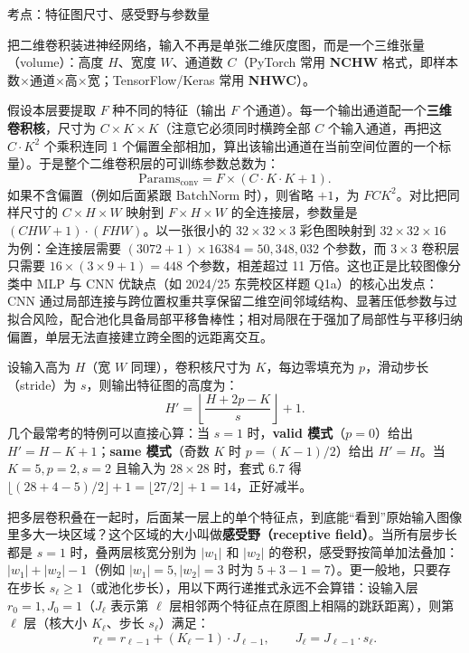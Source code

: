 考点：特征图尺寸、感受野与参数量 

把二维卷积装进神经网络，输入不再是单张二维灰度图，而是一个三维张量（volume）：高度 $H$、宽度 $W$、通道数 $C$（PyTorch 常用 \textbf{NCHW} 格式，即样本数\ensuremath{\times}通道\ensuremath{\times}高\ensuremath{\times}宽；TensorFlow/Keras 常用 \textbf{NHWC}）。

假设本层要提取 $F$ 种不同的特征（输出 $F$ 个通道）。每一个输出通道配一个\textbf{三维卷积核}，尺寸为 $C \times K \times K$（注意它必须同时横跨全部 $C$ 个输入通道，再把这 $C\cdot K^2$ 个乘积连同 1 个偏置全部相加，算出该输出通道在当前空间位置的一个标量）。于是整个二维卷积层的可训练参数总数为：
\[
\text{Params}_{\text{conv}} = F \times (C \cdot K \cdot K + 1).
\tag{6.6}
\]
如果不含偏置（例如后面紧跟 BatchNorm 时），则省略 $+1$，为 $F C K^2$。对比把同样尺寸的 $C\times H\times W$ 映射到 $F\times H\times W$ 的全连接层，参数量是 $(C H W + 1)\cdot(F H W)$。以一张很小的 $32\times 32\times 3$ 彩色图映射到 $32\times 32\times 16$ 为例：全连接层需要 $(3072+1)\times 16384 = 50{,}348{,}032$ 个参数，而 $3\times 3$ 卷积层只需要 $16\times(3\times 9+1) = 448$ 个参数，相差超过 11 万倍。这也正是比较图像分类中 MLP 与 CNN 优缺点（如 2024/25 东莞校区样题 Q1a）的核心出发点：CNN 通过局部连接与跨位置权重共享保留二维空间邻域结构、显著压低参数与过拟合风险，配合池化具备局部平移鲁棒性；相对局限在于强加了局部性与平移归纳偏置，单层无法直接建立跨全图的远距离交互。


设输入高为 $H$（宽 $W$ 同理），卷积核尺寸为 $K$，每边零填充为 $p$，滑动步长（stride）为 $s$，则输出特征图的高度为：
\[
H' = \left\lfloor \frac{H + 2p - K}{s} \right\rfloor + 1.
\tag{6.7}
\]
几个最常考的特例可以直接心算：当 $s=1$ 时，\textbf{valid 模式}（$p=0$）给出 $H' = H - K + 1$；\textbf{same 模式}（奇数 $K$ 时 $p=(K-1)/2$）给出 $H' = H$。当 $K=5, p=2, s=2$ 且输入为 $28\times 28$ 时，套式 6.7 得 $\lfloor(28+4-5)/2\rfloor+1 = \lfloor 27/2 \rfloor + 1 = 14$，正好减半。

把多层卷积叠在一起时，后面某一层上的单个特征点，到底能“看到”原始输入图像里多大一块区域？这个区域的大小叫做\textbf{感受野（receptive field）}。当所有层步长都是 $s=1$ 时，叠两层核宽分别为 $|w_1|$ 和 $|w_2|$ 的卷积，感受野按简单加法叠加：$|w_1| + |w_2| - 1$（例如 $|w_1|=5, |w_2|=3$ 时为 $5+3-1=7$）。更一般地，只要存在步长 $s_\ell \ge 1$（或池化步长），用以下两行递推式永远不会算错：设输入层 $r_0=1, J_0=1$（$J_\ell$ 表示第 $\ell$ 层相邻两个特征点在原图上相隔的跳跃距离），则第 $\ell$ 层（核大小 $K_\ell$、步长 $s_\ell$）满足：
\[
r_\ell = r_{\ell-1} + (K_\ell - 1)\cdot J_{\ell-1}, \qquad J_\ell = J_{\ell-1}\cdot s_\ell.
\tag{6.8}
\]

